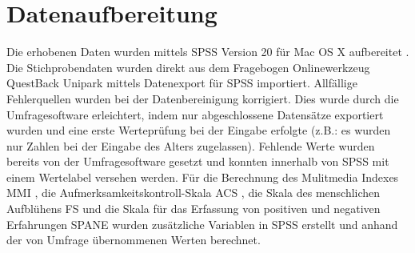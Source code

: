\section{Datenaufbereitung}\label{section.datenaufbereitung}
Die erhobenen Daten wurden mittels SPSS Version 20 für Mac OS X aufbereitet \cite{Spss2011}. Die Stichprobendaten wurden direkt aus dem Fragebogen Onlinewerkzeug QuestBack Unipark \cite{QuestBack2014} mittels Datenexport für SPSS importiert. Allfällige Fehlerquellen wurden bei der Datenbereinigung korrigiert. Dies wurde durch die Umfragesoftware erleichtert, indem nur abgeschlossene Datensätze exportiert wurden und eine erste Werteprüfung bei der Eingabe erfolgte (z.B.: es wurden nur Zahlen bei der Eingabe des Alters zugelassen). Fehlende Werte wurden bereits von der Umfragesoftware gesetzt und konnten innerhalb von SPSS mit einem Wertelabel versehen werden. Für die Berechnung des Mulitmedia Indexes MMI \cite{Ophir2009}, die Aufmerksamkeitskontroll-Skala  ACS \cite{Posner1998}, die Skala des menschlichen Aufblühens FS \cite{Diener:2010} und die Skala für das Erfassung von positiven und negativen Erfahrungen SPANE \cite{Diener:2010} wurden zusätzliche Variablen in SPSS erstellt und anhand der von Umfrage übernommenen Werten berechnet. 

